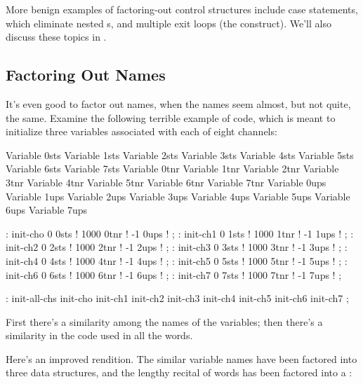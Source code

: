More benign examples of factoring-out control structures include case
statements, which eliminate nested
s, and multiple exit loops
(the 
\forthb{\dots{} } construct). We'll also discuss these
topics in .

\subsection{Factoring Out Names}
%
It's even good to factor out names, when the names seem almost, but
not quite, the same. Examine the following terrible example of code,
which is meant to initialize three variables associated with each of
eight channels:

\begin{Code}
Variable 0sts       Variable 1sts       Variable 2sts 
Variable 3sts       Variable 4sts       Variable 5sts
Variable 6sts       Variable 7sts       Variable 0tnr
Variable 1tnr       Variable 2tnr       Variable 3tnr
Variable 4tnr       Variable 5tnr       Variable 6tnr
Variable 7tnr       Variable 0ups       Variable 1ups
Variable 2ups       Variable 3ups       Variable 4ups
Variable 5ups       Variable 6ups       Variable 7ups
\end{Code}

\begin{Code} 
: init-cho   0 0sts !  1000 0tnr !  -1 0ups ! ; 
: init-ch1   0 1sts !  1000 1tnr !  -1 1ups ! ; 
: init-ch2   0 2sts !  1000 2tnr !  -1 2ups ! ; 
: init-ch3   0 3sts !  1000 3tnr !  -1 3ups ! ; 
: init-ch4   0 4sts !  1000 4tnr !  -1 4ups ! ; 
: init-ch5   0 5sts !  1000 5tnr !  -1 5ups ! ; 
: init-ch6   0 6sts !  1000 6tnr !  -1 6ups ! ; 
: init-ch7   0 7sts !  1000 7tnr !  -1 7ups ! ; 
\end{Code}

\begin{Code} 
: init-all-chs    init-cho  init-ch1  init-ch2  init-ch3
   init-ch4  init-ch5  init-ch6  init-ch7 ;
\end{Code}
First there's a similarity among the names of the variables; then
there's a similarity in the code used in all the 
words.

Here's an improved rendition. The similar variable names have been
factored into three data structures, and the lengthy recital of
 words has been factored into a :

